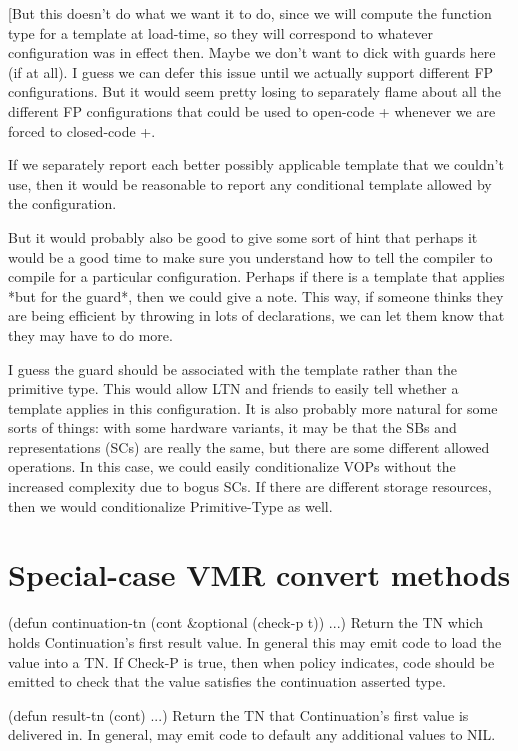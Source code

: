 [But this doesn't do what we want it to do, since we will compute the
function type for a template at load-time, so they will correspond to whatever
configuration was in effect then.  Maybe we don't want to dick with guards here
(if at all).  I guess we can defer this issue until we actually support
different FP configurations.  But it would seem pretty losing to separately
flame about all the different FP configurations that could be used to open-code
+ whenever we are forced to closed-code +.

If we separately report each better possibly applicable template that we
couldn't use, then it would be reasonable to report any conditional template
allowed by the configuration.  

But it would probably also be good to give some sort of hint that perhaps it
would be a good time to make sure you understand how to tell the compiler to
compile for a particular configuration.  Perhaps if there is a template that
applies *but for the guard*, then we could give a note.  This way, if someone
thinks they are being efficient by throwing in lots of declarations, we can let
them know that they may have to do more.

I guess the guard should be associated with the template rather than the
primitive type.  This would allow LTN and friends to easily tell whether a
template applies in this configuration.  It is also probably more natural for
some sorts of things: with some hardware variants, it may be that the SBs and
representations (SCs) are really the same, but there are some different allowed
operations.  In this case, we could easily conditionalize VOPs without the
increased complexity due to bogus SCs.  If there are different storage
resources, then we would conditionalize Primitive-Type as well.



\section{Special-case VMR convert methods}

    (defun continuation-tn (cont \&optional (check-p t))
      ...)
Return the TN which holds Continuation's first result value.  In general
this may emit code to load the value into a TN.  If Check-P is true, then
when policy indicates, code should be emitted to check that the value satisfies
the continuation asserted type.

    (defun result-tn (cont)
      ...)
Return the TN that Continuation's first value is delivered in.  In general,
may emit code to default any additional values to NIL.

